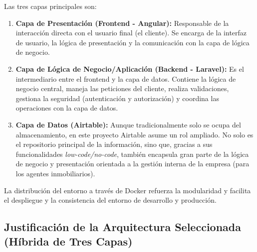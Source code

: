 Las tres capas principales son:

\begin{enumerate}
    \item \textbf{Capa de Presentación (Frontend - Angular):} Responsable de la interacción directa con el usuario final (el cliente). Se encarga de la interfaz de usuario, la lógica de presentación y la comunicación con la capa de lógica de negocio.
    \item \textbf{Capa de Lógica de Negocio/Aplicación (Backend - Laravel):} Es el intermediario entre el frontend y la capa de datos. Contiene la lógica de negocio central, maneja las peticiones del cliente, realiza validaciones, gestiona la seguridad (autenticación y autorización) y coordina las operaciones con la capa de datos.
    \item \textbf{Capa de Datos (Airtable):} Aunque tradicionalmente solo se ocupa del almacenamiento, en este proyecto Airtable asume un rol ampliado. No solo es el repositorio principal de la información, sino que, gracias a sus funcionalidades \textit{low-code/no-code}, también encapsula gran parte de la lógica de negocio y presentación orientada a la gestión interna de la empresa (para los agentes inmobiliarios).
\end{enumerate}

La distribución del entorno a través de Docker refuerza la modularidad y facilita el despliegue y la consistencia del entorno de desarrollo y producción.


\subsection{Justificación de la Arquitectura Seleccionada (Híbrida de Tres Capas)}


